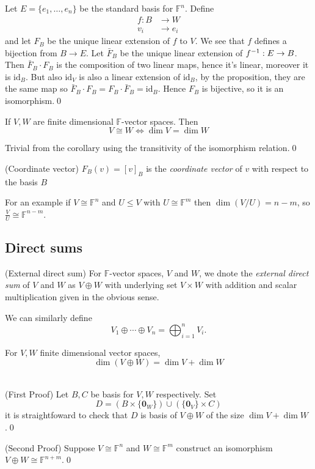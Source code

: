 \documentclass{article}
\newcommand{\F}{\mathbb{F}}
\begin{document}
  \pf Let $ E=\{e_1,\dots, e_n\} $ be the standard basis for $ \F^n $. Define
  \begin{align*}
	  f:B&\to W\\
	  v_i&\to e_i
  \end{align*}
  and let $ F_B $ be the unique linear extension of $ f $ to $ V $. We see that $ f $ defines a bijection from $ B\to E $. Let $ \bar F_B $ be the unique linear extension of $ {f}^{-1}:E\to B $. Then $ \bar F_B\cdot F_B $ is the composition of two linear maps, hence it's linear, moreover it is $ \mathrm{id}_B $. But also $ \mathrm{id}_V $ is also a linear extension of $ \mathrm{id}_B $, by the proposition, they are the same map so $ \bar F_B\cdot F_B=F_B\cdot \bar F_B=\mathrm{id}_B $. Hence $ F_B $ is bijective, so it is an isomorphism.\qed
  \begin{corollary}
    If $ V,W $ are finite dimensional $ \F $-vector spaces. Then
    \[
      V\cong W\iff \dim V=\dim W
    \]
  \end{corollary}
  \pf Trivial from the corollary using the transitivity of the isomorphism relation.\qed
\begin{definition}
	(Coordinate vector) $ F_B(v)=[v]_B $ is the \textit{coordinate vector} of $ v $ with respect to the basis $ B $
\end{definition}
For an example if $ V\cong \F^n $ and $ U\le V $ with $ U\cong \F^m $ then $ \dim(V/U)=n-m $, so $ \frac VU\cong \F^{n-m} $.
\subsection{Direct sums}
\begin{definition}
	(External direct sum) For $ \F $-vector spaces, $ V $ and $ W $, we dnote the \textit{external direct sum} of $ V $ and $ W $ as $ V\oplus W $ with underlying set $ V\times W $ with addition and scalar multiplication given in the obvious sense.
\end{definition}
We can similarly define
\[
	V_1\oplus \cdots \oplus V_n=\bigoplus_{i=1}^nV_i.
\]
\begin{lemma}
  For $ V,W $ finite dimensional vector spaces,
  \[
    \dim(V\oplus W)=\dim V+\dim W
  \]
\end{lemma}
\pf\\(First Proof) Let $ B,C $ be basis for $ V,W $ respectively. Set
\[
	D=(B\times\{\mathbf 0_W\})\cup (\{\mathbf 0_V\}\times C)
\]
it is straightfoward to check that $ D $ is basis of $ V\oplus W $ of the size $ \dim V + \dim W $.\qed\par
(Second Proof) Suppose $ V\cong \F^n $ and $ W\cong \F^m $ construct an isomorphism $ V\oplus W\cong\F^{n+m} $.\qed
\end{document}
